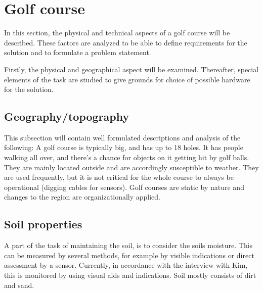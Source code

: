 \section{Golf course}
In this section, the physical and technical aspects of a golf course will be described. These factors are analyzed to be able to define requirements for the solution and to formulate a problem statement.

Firstly, the physical and geographical aspect will be examined. Thereafter, special elements of the task are studied to give grounds for choice of possible hardware for the solution. 

\subsection{Geography/topography}
This subsection will contain well formulated descriptions and analysis of the following: A golf course is typically big, and has up to 18 holes. It has people walking all over, and there's a chance for objects on it getting hit by golf balls. They are mainly located outside and are accordingly susceptible to weather. They are used frequently, but it is not critical for the whole course to always be operational (digging cables for sensors). Golf courses are static by nature and changes to the region are organizationally applied. 

\subsection{Soil properties}
A part of the task of maintaining the soil, is to consider the soils moisture. This can be measured by several methods, for example by visible indications or direct assessment by a sensor. Currently, in accordance with the interview with Kim, this is monitored by using visual aids and indications. Soil mostly consists of dirt and sand.